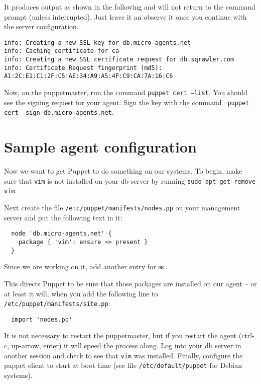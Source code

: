 \documentclass{article}
\newcommand{\domain}{micro-agents.net}
\begin{document}
It produces output as shown in the following and will not return to the command prompt (unless interrupted). Just leave it an observe it once you continue with the server configuration.

\begin{verbatim}
info: Creating a new SSL key for db.micro-agents.net
info: Caching certificate for ca
info: Creating a new SSL certificate request for db.sqrawler.com
info: Certificate Request fingerprint (md5): A1:2C:E1:C1:2F:C5:AE:34:A9:A5:4F:C9:CA:7A:16:C6

\end{verbatim}

Now, on the puppetmaster, run the command \texttt{puppet cert --list}.  You should see the signing request for your agent.  Sign the key with the command \texttt{ puppet cert --sign db.\domain}.

\section{Sample agent configuration}
Now we want to get Puppet to do something on our systems.  To begin, make sure that \texttt{vim} is not installed on your db server by running \texttt{sudo apt-get remove vim}. 

Next create the file \texttt{/etc/puppet/manifests/nodes.pp} on your management server and put the following text in it:
\begin{verbatim}
  node 'db.micro-agents.net' {
    package { 'vim': ensure => present }
  }
\end{verbatim}

Since we are working on it, add another entry for \texttt{mc}.

This directs Puppet to be sure that those packages are installed on our agent -- or at least it will, when you add the following line to \texttt{/etc/puppet/manifests/site.pp}:

\begin{verbatim}
  import 'nodes.pp'
\end{verbatim}

It is not necessary to restart the puppetmaster, but if you restart the agent (ctrl-c, up-arrow, enter) it will speed the process along.  Log into your db server in another session and check to see that \texttt{vim} was installed. Finally, configure the puppet client to start at boot time (see file \texttt{/etc/default/puppet} for Debian systems).
\end{document}
